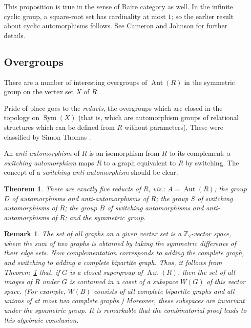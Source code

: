\documentclass[12pt]{article}
\newtheorem{theorem}{Theorem}
\newtheorem{remark}{Remark}
\DeclareMathOperator{\Sym}{Sym}
\DeclareMathOperator{\Aut}{Aut}
\begin{document}
This proposition is true in the sense of Baire category as well. In
the infinite cyclic group, a square-root set has cardinality at most
$1$; so the earlier result about cyclic automorphisms follows. See
Cameron and Johnson \cite{ch32:bib9} for further details.

\subsection{Overgroups}

There are a number of interesting overgroups of $\Aut(R)$ in the symmetric
group on the vertex set $X$ of $R$.

Pride of place goes to the \emph{reducts}, the overgroups which are closed
in the topology on $\Sym(X)$ (that is, which are automorphism groups of
relational structures which can be defined from $R$ without parameters).
These were classified by Simon Thomas \cite{ch32:bib50}.

An \emph{anti-automorphism}
of $R$ is an isomorphism from $R$ to its complement; a
\emph{switching automorphism} maps $R$ to a graph equivalent to
$R$ by switching. The concept of a \emph{switching
anti-automorphism} should be clear.

\begin{theorem}\label{ch32:them8.3} 
There are exactly five reducts of $R$, viz.: $A = \Aut(R)$; the
group $D$ of automorphisms and anti-automorphisms of $R$; the group
$S$ of switching automorphisms of $R$; the group $B$ of switching
automorphisms and anti-automorphisms of $R$; and the symmetric
group.
\end{theorem}

\begin{remark}\label{ch32:rema8.1}\rm
The set of all graphs on a given vertex set is
a $\mathbb{Z}_2$-vector space, where the sum of two graphs is
obtained by taking the symmetric difference of their edge sets. Now
complementation corresponds to adding the complete graph, and
switching to adding a complete bipartite graph. Thus, it follows
from Theorem~\ref{ch32:them8.3} that, if $G$ is a closed supergroup
of $\Aut(R)$, then the set of all images of $R$ under $G$ is
contained in a coset of a subspace $W(G)$ of this vector space. (For
example, $W(B)$ consists of all complete bipartite graphs and all
unions of at most two complete graphs.) Moreover, these subspaces
are invariant under the symmetric group. It is remarkable that the
combinatorial proof leads to this algebraic conclusion.
\end{remark}
\end{document}
